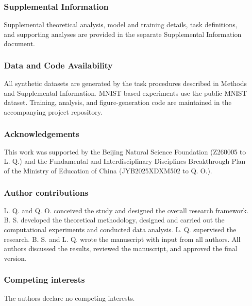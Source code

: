 \documentclass{article}
\begin{document}
\subsubsection*{Supplemental Information}

Supplemental theoretical analysis, model and training details, task definitions, and supporting analyses are provided in the separate Supplemental Information document.

\subsubsection*{Data and Code Availability}

All synthetic datasets are generated by the task procedures described in Methods and Supplemental Information. MNIST-based experiments use the public MNIST dataset. Training, analysis, and figure-generation code are maintained in the accompanying project repository.

\subsubsection*{Acknowledgements}

This work was supported by the Beijing Natural Science Foundation (Z260005 to L. Q.) and the Fundamental and Interdisciplinary Disciplines Breakthrough Plan of the Ministry of Education of China (JYB2025XDXM502 to Q. O.).

\subsubsection*{Author contributions}

L. Q. and Q. O. conceived the study and designed the overall research framework. B. S. developed the theoretical methodology, designed and carried out the computational experiments and conducted data analysis. L. Q. supervised the research. B. S. and L. Q. wrote the manuscript with input from all authors. All authors discussed the results, reviewed the manuscript, and approved the final version.

\subsubsection*{Competing interests}

The authors declare no competing interests.




\end{document}
